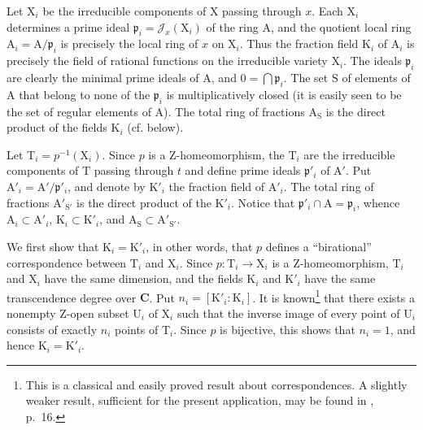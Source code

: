 Let $\mathrm{X}_i$ be the irreducible components of $\mathrm{X}$ passing through $x$. Each $\mathrm{X}_i$ determines a prime ideal $\mathfrak{p}_i=\mathcal{J}_x(\mathrm{X}_i)$ of the ring $\mathrm{A}$, and the quotient local ring $\mathrm{A}_i=\mathrm{A}/\mathfrak{p}_i$ is precisely the local ring of $x$ on $\mathrm{X}_i$. Thus the fraction field $\mathrm{K}_i$ of $\mathrm{A}_i$ is precisely the field of rational functions on the irreducible variety $\mathrm{X}_i$. The ideals $\mathfrak{p}_i$ are clearly the minimal prime ideals of $\mathrm{A}$, and $0=\bigcap\mathfrak{p}_i$. The set $\mathrm{S}$ of elements of $\mathrm{A}$ that belong to none of the $\mathfrak{p}_i$ is multiplicatively closed (it is easily seen to be the set of regular elements of $\mathrm{A}$). The total ring of fractions $\mathrm{A}_\mathrm{S}$ is the direct product of the fields $\mathrm{K}_i$ (cf.  below).

Let $\mathrm{T}_i=p^{-1}(\mathrm{X}_i)$. Since $p$ is a Z-homeomorphism, the $\mathrm{T}_i$ are the irreducible components of $\mathrm{T}$ passing through $t$ and define prime ideals $\mathfrak{p}'_i$ of $\mathrm{A}'$. Put $\mathrm{A}'_i=\mathrm{A}'/\mathfrak{p}'_i$, and denote by $\mathrm{K}'_i$ the fraction field of $\mathrm{A}'_i$. The total ring of fractions $\mathrm{A}'_{\mathrm{S}'}$ is the direct product of the $\mathrm{K}'_i$. Notice that $\mathfrak{p}'_i\cap \mathrm{A}=\mathfrak{p}_i$, whence $\mathrm{A}_i\subset \mathrm{A}'_i$, $\mathrm{K}_i\subset \mathrm{K}'_i$, and $\mathrm{A}_\mathrm{S}\subset \mathrm{A}'_{\mathrm{S}'}$.

We first show that $\mathrm{K}_i=\mathrm{K}'_i$, in other words, that $p$ defines a ``birational'' correspondence between $\mathrm{T}_i$ and $\mathrm{X}_i$. Since $p:\mathrm{T}_i\to \mathrm{X}_i$ is a Z-homeomorphism, $\mathrm{T}_i$ and $\mathrm{X}_i$ have the same dimension, and the fields $\mathrm{K}_i$ and $\mathrm{K}'_i$ have the same transcendence degree over $\mathbf{C}$. Put $n_i=[\mathrm{K}'_i:\mathrm{K}_i]$. It is known\footnote{This is a classical and easily proved result about correspondences. A slightly weaker result, sufficient for the present application, may be found in , p.~16.} that there exists a nonempty Z-open subset $\mathrm{U}_i$ of $\mathrm{X}_i$ such that the inverse image of every point of $\mathrm{U}_i$ consists of exactly $n_i$ points of $\mathrm{T}_i$. Since $p$ is bijective, this shows that $n_i=1$, and hence $\mathrm{K}_i=\mathrm{K}'_i$.


